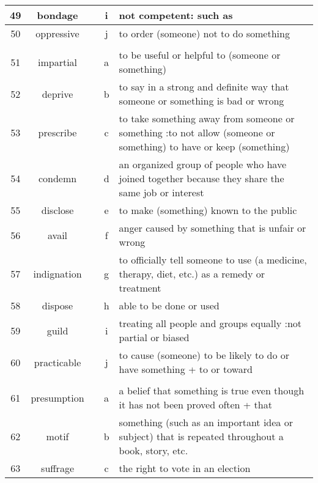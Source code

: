 \documentclass[a4paper]{article}
\begin{document}
\begin{center}
\begin{tabular}{|c|c|c|c|m{}|}
\hline
 49 & bondage & & i &  not competent: such as\\
\hline
 50 & oppressive & & j &  to order (someone) not to do something \\
\hline
 & & & & \\
\hline
 51 & impartial & & a &  to be useful or helpful to (someone or something) \\
\hline
 52 & deprive & & b &  to say in a strong and definite way that someone or something is bad or wrong \\
\hline
 53 & prescribe & & c &  to take something away from someone or something :to not allow (someone or something) to have or keep (something) \\
\hline
 54 & condemn & & d &  an organized group of people who have joined together because they share the same job or interest \\
\hline
 55 & disclose & & e &  to make (something) known to the public \\
\hline
 56 & avail & & f &  anger caused by something that is unfair or wrong \\
\hline
 57 & indignation & & g &  to officially tell someone to use (a medicine, therapy, diet, etc.) as a remedy or treatment \\
\hline
 58 & dispose & & h &  able to be done or used \\
\hline
 59 & guild & & i &  treating all people and groups equally :not partial or biased \\
\hline
 60 & practicable & & j &  to cause (someone) to be likely to do or have something + to or toward \\
\hline
 & & & & \\
\hline
 61 & presumption & & a &  a belief that something is true even though it has not been proved often + that \\
\hline
 62 & motif & & b &  something (such as an important idea or subject) that is repeated throughout a book, story, etc.\\
\hline
 63 & suffrage & & c &  the right to vote in an election \\
\hline
\end{tabular}
\end{center}
\end{document}
